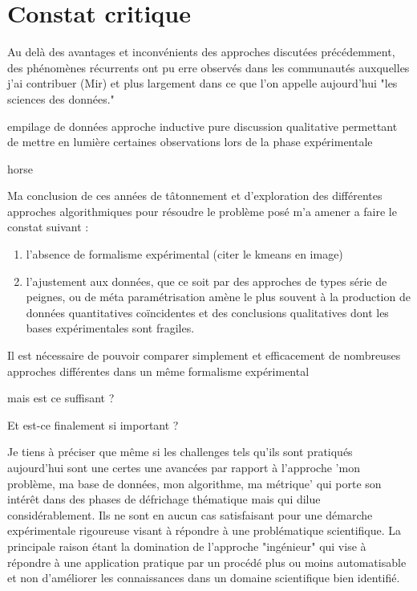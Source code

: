 \section{Constat critique}

Au delà des avantages et inconvénients des approches discutées précédemment, des phénomènes récurrents ont pu erre observés dans les communautés auxquelles j'ai contribuer (Mir) et plus largement dans ce que l'on appelle aujourd'hui "les sciences des données."

empilage de données
approche inductive pure
discussion qualitative permettant de mettre en lumière certaines observations lors de la phase expérimentale

horse

Ma conclusion de ces années de tâtonnement et d'exploration des différentes approches algorithmiques pour résoudre le problème posé m'a amener a faire le constat suivant :
\begin{enumerate}
  \item l'absence de formalisme expérimental (citer le kmeans en image)
  \item l'ajustement aux données, que ce soit par des approches de types série de peignes, ou de méta paramétrisation amène le plus souvent à la production de données quantitatives coïncidentes et des conclusions qualitatives dont les bases expérimentales sont fragiles.

\end{enumerate}

 Il est nécessaire de pouvoir comparer simplement et efficacement de nombreuses approches différentes dans un même formalisme expérimental

 mais est ce suffisant ?

 Et est-ce finalement si important ?


Je tiens à préciser que même si les challenges tels qu'ils sont pratiqués aujourd'hui sont une certes une avancées par rapport à l'approche 'mon problème, ma base de données, mon algorithme, ma métrique' qui porte son intérêt dans des phases de défrichage thématique mais qui dilue considérablement. Ils  ne sont en aucun cas satisfaisant pour une démarche expérimentale rigoureuse visant à répondre à une problématique scientifique. La principale raison étant la domination de l'approche "ingénieur" qui vise à répondre à une application pratique par un procédé plus ou moins automatisable et non d'améliorer les connaissances dans un domaine scientifique bien identifié.

